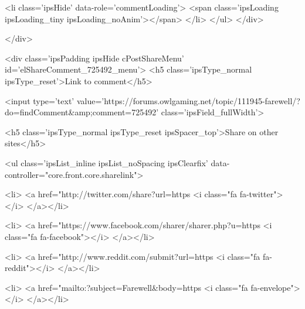 						
						
					
					<li class='ipsHide' data-role='commentLoading'>
						<span class='ipsLoading ipsLoading_tiny ipsLoading_noAnim'></span>
					</li>
				</ul>
			</div>
		

		
			

		
	</div>

	

	



<div class='ipsPadding ipsHide cPostShareMenu' id='elShareComment_725492_menu'>
	<h5 class='ipsType_normal ipsType_reset'>Link to comment</h5>
	
		
	
	
	<input type='text' value='https://forums.owlgaming.net/topic/111945-farewell/?do=findComment&amp;comment=725492' class='ipsField_fullWidth'>

	
	<h5 class='ipsType_normal ipsType_reset ipsSpacer_top'>Share on other sites</h5>
	

	<ul class='ipsList_inline ipsList_noSpacing ipsClearfix' data-controller="core.front.core.sharelink">
		
			<li>
<a href="http://twitter.com/share?url=https%
	<i class="fa fa-twitter"></i>
</a></li>
		
			<li>
<a href="https://www.facebook.com/sharer/sharer.php?u=https%
	<i class="fa fa-facebook"></i>
</a></li>
		
			<li>
<a href="http://www.reddit.com/submit?url=https%
	<i class="fa fa-reddit"></i>
</a></li>
		
			<li>
<a href="mailto:?subject=Farewell&body=https%
	<i class="fa fa-envelope"></i>
</a></li>
		
